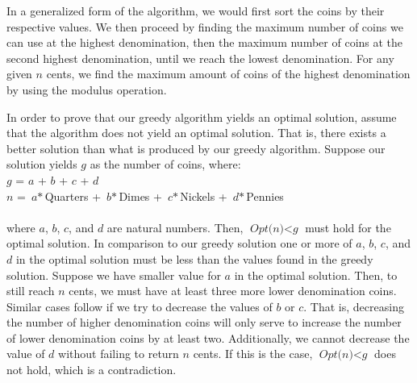 \documentclass[]{report}
\begin{document}
\begin{enumerate}
	In a generalized form of the algorithm, we would first sort the coins by their respective values. We then proceed by finding the maximum number of coins we can use at the highest denomination, then the maximum number of coins at the second highest denomination, until we reach the lowest denomination. For any given $ \textit{n} $ cents, we find the maximum amount of coins of the highest denomination by using the modulus operation. 
	
	In order to prove that our greedy algorithm yields an optimal solution, assume that the algorithm does not yield an optimal solution. That is, there exists a better solution than what is produced by our greedy algorithm. Suppose our solution yields $\textit{g}$ as the number of coins, where: \\ 
	$ \textit{g} $ = $ \textit{a} $ + $ \textit{b} $ + $ \textit{c} $ + $ \textit{d} $ \\
	 $\textit{n}$ = $\textit{a}*$Quarters + $\textit{b}*$Dimes + $\textit{c}*$Nickels + $\textit{d}*$Pennies\\ \\
	 where $\textit{a}$, $\textit{b}$, $\textit{c}$, and $\textit{d}$ are natural numbers. Then, $ \textit{Opt(n)} <  \textit{g}$ must hold for the optimal solution. In comparison to our greedy solution one or more of $\textit{a}$, $\textit{b}$, $\textit{c}$, and $\textit{d}$ in the optimal solution must be less than the values found in the greedy solution. Suppose we have smaller value for $\textit{a}$ in the optimal solution. Then, to still reach $\textit{n}$ cents, we must have at least three more lower denomination coins. Similar cases follow if we try to decrease the values of $ \textit{b} $ or $ \textit{c} $. That is, decreasing the number of higher denomination coins will only serve to increase the number of lower denomination coins by at least two. Additionally, we cannot decrease the value of $ \textit{d} $ without failing to return $ \textit{n} $ cents.  If this is the case, $ \textit{Opt(n)} <  \textit{g}$ does not hold, which is a contradiction. \\
	 

\end{enumerate}
\end{document}
